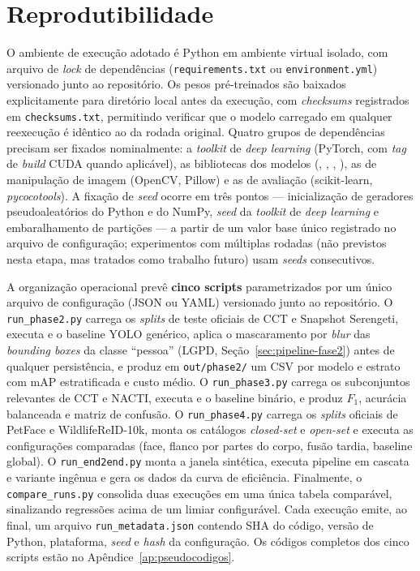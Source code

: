 \section{Reprodutibilidade}
\label{sec:metodologia-reprodutibilidade}

O ambiente de execução adotado é Python em ambiente virtual isolado, com arquivo de \emph{lock} de dependências (\texttt{requirements.txt} ou \texttt{environment.yml}) versionado junto ao repositório. Os pesos pré-treinados são baixados explicitamente para diretório local antes da execução, com \emph{checksums} registrados em \texttt{checksums.txt}, permitindo verificar que o modelo carregado em qualquer reexecução é idêntico ao da rodada original. Quatro grupos de dependências precisam ser fixados nominalmente: a \emph{toolkit} de \emph{deep learning} (PyTorch, com \emph{tag} de \emph{build} CUDA quando aplicável), as bibliotecas dos modelos (\modeloMD, \modeloSN, \modeloPetFace, \modeloWildlife), as de manipulação de imagem (OpenCV, Pillow) e as de avaliação (scikit-learn, \emph{pycocotools}). A fixação de \emph{seed} ocorre em três pontos --- inicialização de geradores pseudoaleatórios do Python e do NumPy, \emph{seed} da \emph{toolkit} de \emph{deep learning} e embaralhamento de partições --- a partir de um valor base único registrado no arquivo de configuração; experimentos com múltiplas rodadas (não previstos nesta etapa, mas tratados como trabalho futuro) usam \emph{seeds} consecutivos.

A organização operacional prevê \textbf{cinco scripts} parametrizados por um único arquivo de configuração (JSON ou YAML) versionado junto ao repositório. O \texttt{run\_phase2.py} carrega os \emph{splits} de teste oficiais de CCT e Snapshot Serengeti, executa \modeloMD{} e o baseline YOLO genérico, aplica o mascaramento por \emph{blur} das \emph{bounding boxes} da classe ``pessoa'' (LGPD, Seção~\ref{sec:pipeline-fase2}) antes de qualquer persistência, e produz em \texttt{out/phase2/} um CSV por modelo e estrato com mAP estratificada e custo médio. O \texttt{run\_phase3.py} carrega os subconjuntos relevantes de CCT e NACTI, executa \modeloSN{} e o baseline binário, e produz $F_1$, acurácia balanceada e matriz de confusão. O \texttt{run\_phase4.py} carrega os \emph{splits} oficiais de PetFace e WildlifeReID-10k, monta os catálogos \emph{closed-set} e \emph{open-set} e executa as configurações comparadas (face, flanco por partes do corpo, fusão tardia, baseline global). O \texttt{run\_end2end.py} monta a janela sintética, executa pipeline em cascata e variante ingênua e gera os dados da curva de eficiência. Finalmente, o \texttt{compare\_runs.py} consolida duas execuções em uma única tabela comparável, sinalizando regressões acima de um limiar configurável. Cada execução emite, ao final, um arquivo \texttt{run\_metadata.json} contendo SHA do código, versão de Python, plataforma, \emph{seed} e \emph{hash} da configuração. Os códigos completos dos cinco scripts estão no Apêndice~\ref{ap:pseudocodigos}.
